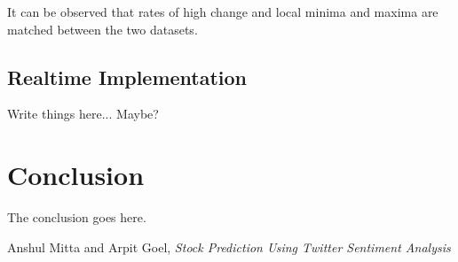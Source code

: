\documentclass[12pt,journal,compsoc]{IEEEtran}
\begin{document}
It can be observed that rates of high change and local minima and maxima are matched between the two datasets.

\subsection{Realtime Implementation}
Write things here... Maybe?

\section{Conclusion}
The conclusion goes here.

\begin{thebibliography}{1}

Anshul Mitta and Arpit Goel, \textit{Stock Prediction Using Twitter Sentiment Analysis}
\end{thebibliography}
\end{document}
